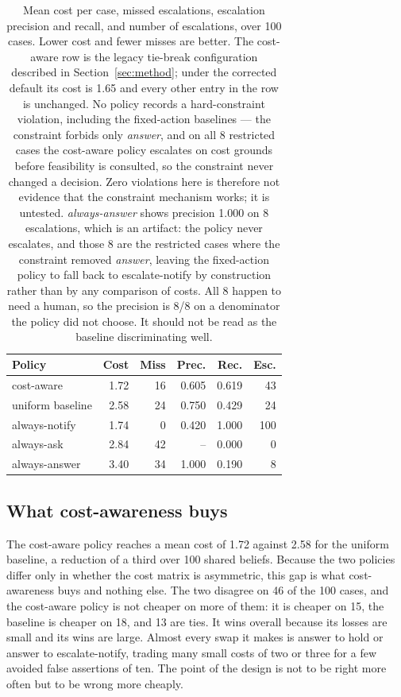 \documentclass{article}
\begin{document}
\begin{table}[t]
\centering
\begin{tabular}{lrrrrr}
\toprule
Policy & Cost & Miss & Prec. & Rec. & Esc. \\
\midrule
cost-aware        & 1.72 & 16 & 0.605 & 0.619 & 43 \\
uniform baseline  & 2.58 & 24 & 0.750 & 0.429 & 24 \\
always-notify     & 1.74 & 0  & 0.420 & 1.000 & 100 \\
always-ask        & 2.84 & 42 & --    & 0.000 & 0 \\
always-answer     & 3.40 & 34 & 1.000 & 0.190 & 8 \\
\bottomrule
\end{tabular}
\caption{Mean cost per case, missed escalations, escalation precision and recall,
and number of escalations, over 100 cases. Lower cost and fewer misses are
better. The cost-aware row is the legacy tie-break configuration described in
Section~\ref{sec:method}; under the corrected default its cost is 1.65 and every
other entry in the row is unchanged. No policy records a hard-constraint
violation, including the fixed-action
baselines --- the constraint forbids only \emph{answer}, and on all 8 restricted
cases the cost-aware policy escalates on cost grounds before feasibility is
consulted, so the constraint never changed a decision. Zero violations here is
therefore not evidence that the constraint mechanism works; it is untested.
\emph{always-answer} shows precision 1.000 on 8 escalations, which is an artifact:
the policy never escalates, and those 8 are the restricted cases where the
constraint removed \emph{answer}, leaving the fixed-action policy to fall back to
escalate-notify by construction rather than by any comparison of costs. All
8 happen to need a human, so the precision is 8/8 on a denominator the policy did
not choose. It should not be read as the baseline discriminating well.}
\label{tab:results}
\end{table}

\subsection{What cost-awareness buys}
The cost-aware policy reaches a mean cost of 1.72 against 2.58 for the uniform
baseline, a reduction of a third over 100 shared beliefs. Because the two
policies differ only in whether the cost matrix is asymmetric, this gap is what
cost-awareness buys and nothing else. The two disagree on 46 of the 100 cases,
and the cost-aware policy is not cheaper on more of them: it is cheaper on 15,
the baseline is cheaper on 18, and 13 are ties. It wins overall because its
losses are small and its wins are large. Almost every swap it makes is answer to
hold or answer to escalate-notify, trading many small costs of two or three for a
few avoided false assertions of ten. The point of the design is not to be right
more often but to be wrong more cheaply.
\end{document}
